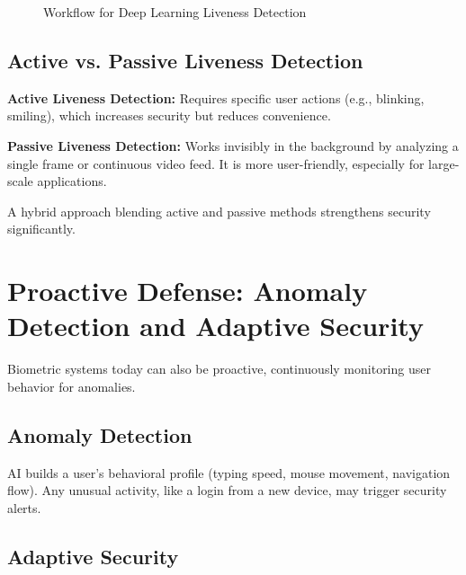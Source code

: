 \documentclass[12pt,a4paper]{report}
\begin{document}
\begin{figure}[h!]
    \centering
    \caption{Workflow for Deep Learning Liveness Detection}
    \label{fig:livenessworkflow}
\end{figure}

\subsection{Active vs. Passive Liveness Detection}

\textbf{Active Liveness Detection:} Requires specific user actions (e.g., blinking, smiling), which increases security but reduces convenience.  

\textbf{Passive Liveness Detection:} Works invisibly in the background by analyzing a single frame or continuous video feed. It is more user-friendly, especially for large-scale applications.  

A hybrid approach blending active and passive methods strengthens security significantly.

\section{Proactive Defense: Anomaly Detection and Adaptive Security}

Biometric systems today can also be proactive, continuously monitoring user behavior for anomalies.

\subsection{Anomaly Detection}

AI builds a user’s behavioral profile (typing speed, mouse movement, navigation flow). Any unusual activity, like a login from a new device, may trigger security alerts.

\subsection{Adaptive Security}
\end{document}
